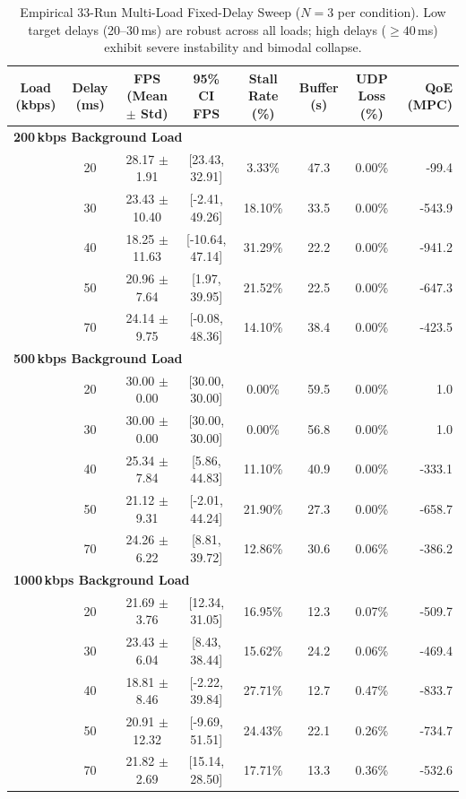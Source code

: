 \begin{table}[t]
\centering
\caption{Empirical 33-Run Multi-Load Fixed-Delay Sweep ($N=3$ per condition). Low target delays (20--30\,ms) are robust across all loads; high delays ($\ge 40$\,ms) exhibit severe instability and bimodal collapse.}
\label{tab:fixed_sweep}
\small
\begin{tabular}{cccccccr}
\toprule
\textbf{Load (kbps)} & \textbf{Delay (ms)} & \textbf{FPS (Mean $\pm$ Std)} & \textbf{95\% CI FPS} & \textbf{Stall Rate (\%)} & \textbf{Buffer (s)} & \textbf{UDP Loss (\%)} & \textbf{QoE (MPC)} \\
\midrule
\multicolumn{8}{l}{\textbf{200\,kbps Background Load}} \\
  & 20 & 28.17 $\pm$ 1.91 & [23.43, 32.91] & 3.33\% & 47.3 & 0.00\% & -99.4 \\
  & 30 & 23.43 $\pm$ 10.40 & [-2.41, 49.26] & 18.10\% & 33.5 & 0.00\% & -543.9 \\
  & 40 & 18.25 $\pm$ 11.63 & [-10.64, 47.14] & 31.29\% & 22.2 & 0.00\% & -941.2 \\
  & 50 & 20.96 $\pm$ 7.64 & [1.97, 39.95] & 21.52\% & 22.5 & 0.00\% & -647.3 \\
  & 70 & 24.14 $\pm$ 9.75 & [-0.08, 48.36] & 14.10\% & 38.4 & 0.00\% & -423.5 \\
\midrule
\multicolumn{8}{l}{\textbf{500\,kbps Background Load}} \\
  & 20 & 30.00 $\pm$ 0.00 & [30.00, 30.00] & 0.00\% & 59.5 & 0.00\% & 1.0 \\
  & 30 & 30.00 $\pm$ 0.00 & [30.00, 30.00] & 0.00\% & 56.8 & 0.00\% & 1.0 \\
  & 40 & 25.34 $\pm$ 7.84 & [5.86, 44.83] & 11.10\% & 40.9 & 0.00\% & -333.1 \\
  & 50 & 21.12 $\pm$ 9.31 & [-2.01, 44.24] & 21.90\% & 27.3 & 0.00\% & -658.7 \\
  & 70 & 24.26 $\pm$ 6.22 & [8.81, 39.72] & 12.86\% & 30.6 & 0.06\% & -386.2 \\
\midrule
\multicolumn{8}{l}{\textbf{1000\,kbps Background Load}} \\
  & 20 & 21.69 $\pm$ 3.76 & [12.34, 31.05] & 16.95\% & 12.3 & 0.07\% & -509.7 \\
  & 30 & 23.43 $\pm$ 6.04 & [8.43, 38.44] & 15.62\% & 24.2 & 0.06\% & -469.4 \\
  & 40 & 18.81 $\pm$ 8.46 & [-2.22, 39.84] & 27.71\% & 12.7 & 0.47\% & -833.7 \\
  & 50 & 20.91 $\pm$ 12.32 & [-9.69, 51.51] & 24.43\% & 22.1 & 0.26\% & -734.7 \\
  & 70 & 21.82 $\pm$ 2.69 & [15.14, 28.50] & 17.71\% & 13.3 & 0.36\% & -532.6 \\
\bottomrule
\end{tabular}
\end{table}